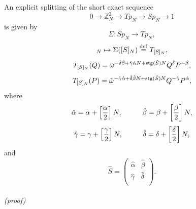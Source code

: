 \documentclass[12pt]{iopart}
\newcommand{\deq}{\stackrel{\rm{\tiny def}}{=}}
\begin{document}
An explicit splitting of the short exact sequence
\begin{equation}
0\rightarrow\mathbb Z_N^2\rightarrow Tp_N\rightarrow Sp_N\rightarrow1
\end{equation}
is given by
\begin{equation}
\Sigma: Sp_N\rightarrow Tp_N,
\end{equation}
\begin{equation}
[S]_N\mapsto\Sigma([S]_N)\deq T_{[S]_N},
\end{equation}
\begin{equation}
T_{[S]_N}(Q)
=
\check\omega^{-\hat\delta\hat\beta+\hat\gamma\hat\alpha N+{\rm stg}(\hat S)N}
Q^{\hat\delta}P^{-\hat\beta},
\end{equation}
\begin{equation}
T_{[S]_N}(P)
=
\check\omega^{-\hat\gamma\hat\alpha+\hat\delta\hat\beta N+{\rm stg}(\hat S)N}
Q^{-\hat\gamma}P^{\hat\alpha},
\end{equation}
where
\begin{equation}
\hat\alpha=\alpha+\left[\frac\alpha2\right]N,
\hspace{10mm}
\hat\beta=\beta+\left[\frac\beta2\right]N,
\end{equation}
\begin{equation}
\hat\gamma=\gamma+\left[\frac\gamma2\right]N,
\hspace{10mm}
\hat\delta=\delta+\left[\frac\delta2\right]N,
\end{equation}
and
\begin{equation}
\hat S=\left(\begin{array}{cc}
\hat\alpha & \hat\beta \\
\hat\gamma & \hat\delta \\
\end{array}\right).
\end{equation}
\ \\

\noindent
{\it (proof)}
\end{document}
